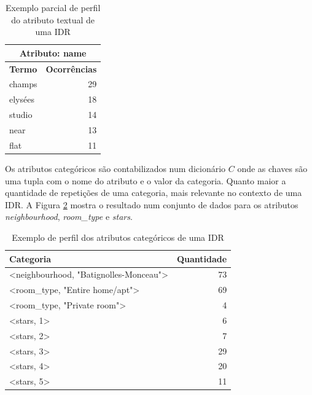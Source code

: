 \begin{table}[!h]
	\centering
	\begin{tabular}{|l|r|}
	\hline
	\multicolumn{2}{|c|}{\textbf{Atributo: name}} \\ \hline
	\textbf{Termo}     & \textbf{Ocorrências}     \\ \hline
	champs             & 29                       \\ \hline
	elysées            & 18                       \\ \hline
	studio             & 14                       \\ \hline
	near               & 13                       \\ \hline
	flat               & 11                       \\ \hline
	\end{tabular}
	\caption{Exemplo parcial de perfil do atributo textual de uma IDR}
	\label{table:perfil-textual}
\end{table}

Os atributos categóricos são contabilizados num dicionário $C$ onde as chaves são uma tupla com o nome do atributo e o valor da categoria. Quanto maior a quantidade de repetições de uma categoria, mais relevante no contexto de uma IDR. A Figura \ref{table:perfil-categoricos} mostra o resultado num conjunto de dados para os atributos {\em neighbourhood}, {\em room\_type} e {\em stars}.

\begin{table}[!h]
	\centering
	\begin{tabular}{|l|r|}
	\hline
	\textbf{Categoria}                                            & \textbf{Quantidade} \\ \hline
	\textless{}neighbourhood, "Batignolles-Monceau"\textgreater{} & 73                  \\ \hline
	\textless{}room\_type, "Entire home/apt"\textgreater{}        & 69                  \\ \hline
	\textless{}room\_type, "Private room"\textgreater{}           & 4                   \\ \hline
	\textless{}stars, 1\textgreater{}                             & 6                   \\ \hline
	\textless{}stars, 2\textgreater{}                             & 7                   \\ \hline
	\textless{}stars, 3\textgreater{}                             & 29                  \\ \hline
	\textless{}stars, 4\textgreater{}                             & 20                  \\ \hline
	\textless{}stars, 5\textgreater{}                             & 11                  \\ \hline
	\end{tabular}
	\caption{Exemplo de perfil dos atributos categóricos de uma IDR}
	\label{table:perfil-categoricos}
\end{table}

